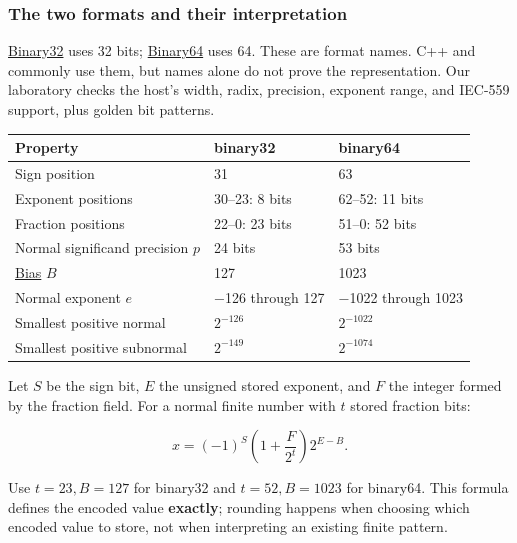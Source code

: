 \subsubsection{The two formats and their interpretation}\label{01-foundations-i-ch001-the-two-formats-and-their-interpretation}

\hypertarget{01-foundations-i-ch001-the-two-formats-and-their-interpretation}{}

\hyperref[appendix-5057f9ad327f]{Binary32} uses 32 bits; \hyperref[appendix-5078dfab64e6]{Binary64} uses 64. These are format names. C++  and  commonly use them, but names alone do not prove the representation. Our laboratory checks the host's width, radix, precision, exponent range, and IEC-559 support, plus golden bit patterns.

{\def\LTcaptype{none} %
\begin{longtable}[]{@{}lll@{}}
\toprule\noalign{}
Property & binary32 & binary64 \\
\midrule\noalign{}
\endhead
\bottomrule\noalign{}
\endlastfoot
Sign position & 31 & 63 \\
Exponent positions & 30--23: 8 bits & 62--52: 11 bits \\
Fraction positions & 22--0: 23 bits & 51--0: 52 bits \\
Normal significand precision \(p\) & 24 bits & 53 bits \\
\hyperref[appendix-2fae058c82e1]{Bias} \(B\) & 127 & 1023 \\
Normal exponent \(e\) & −126 through 127 & −1022 through 1023 \\
Smallest positive normal & \(2^{-126}\) & \(2^{-1022}\) \\
Smallest positive subnormal & \(2^{-149}\) & \(2^{-1074}\) \\
\end{longtable}
}

Let \(S\) be the sign bit, \(E\) the unsigned stored exponent, and \(F\) the integer formed by the fraction field. For a normal finite number with \(t\) stored fraction bits:

\[
x=(-1)^S\left(1+\frac{F}{2^t}\right)2^{E-B}.
\]

Use \(t=23,B=127\) for binary32 and \(t=52,B=1023\) for binary64. This formula defines the encoded value \textbf{exactly}; rounding happens when choosing which encoded value to store, not when interpreting an existing finite pattern.

